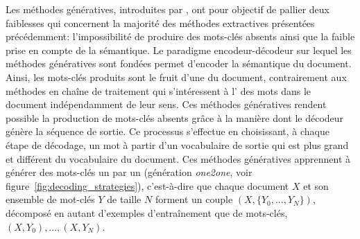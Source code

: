 Les méthodes génératives, introduites par \citet{meng_deep_2017}, ont pour objectif de pallier deux faiblesses qui concernent la majorité des méthodes extractives présentées précédemment: l'impossibilité de produire des mots-clés absents ainsi que la faible prise en compte de la sémantique.
Le paradigme encodeur-décodeur sur lequel les méthodes génératives sont fondées permet d'encoder la sémantique du document.
Ainsi, les mots-clés produits sont le fruit d'une  du document, contrairement aux méthodes en chaîne de traitement qui s'intéressent à l' des mots dans le document indépendamment de leur sens.
%
Ces méthodes génératives rendent possible la production de mots-clés absents grâce à la manière dont le décodeur génère la séquence de sortie.
Ce processus s'effectue en choisissant, à chaque étape de décodage, un mot à partir d'un vocabulaire de sortie qui est plus grand et différent du vocabulaire du document.
Ces méthodes génératives apprennent à générer des mots-clés un par un (génération \emph{one2one}, voir figure~\ref{fig:decoding_strategies}), c'est-à-dire que chaque document $X$ et son ensemble de mot-clés $Y$ de taille $N$ forment un couple $(X, \{Y_0, ..., Y_N\})$, décomposé en autant d'exemples d'entraînement que de mots-clés, $(X, Y_0), ... , (X, Y_N)$.


